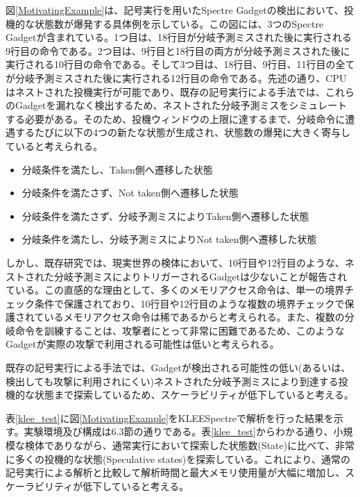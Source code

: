 図\ref{MotivatingExample}は、記号実行を用いたSpectre Gadgetの検出において、投機的な状態数が爆発する具体例を示している。この図には、3つのSpectre Gadgetが含まれている。1つ目は、18行目が分岐予測ミスされた後に実行される9行目の命令である。2つ目は、9行目と18行目の両方が分岐予測ミスされた後に実行される10行目の命令である。そして3つ目は、18行目、9行目、11行目の全てが分岐予測ミスされた後に実行される12行目の命令である。先述の通り、CPUはネストされた投機実行が可能であり、既存の記号実行による手法\cite{guarnieri2020spectector,wang2020kleespectre}では、これらのGadgetを漏れなく検出するため、ネストされた分岐予測ミスをシミュレートする必要がある。そのため、投機ウィンドウの上限に達するまで、分岐命令に遭遇するたびに以下の4つの新たな状態が生成され、状態数の爆発に大きく寄与していると考えられる。\par

\begin{itemize}
  \item 分岐条件を満たし、Taken側へ遷移した状態
  \item 分岐条件を満たさず、Not taken側へ遷移した状態
  \item 分岐条件を満たさず、分岐予測ミスによりTaken側へ遷移した状態  
  \item 分岐条件を満たし、分岐予測ミスによりNot taken側へ遷移した状態
\end{itemize}

しかし、既存研究\cite{oleksenko2020specfuzz}では、現実世界の検体において、10行目や12行目のような、ネストされた分岐予測ミスによりトリガーされるGadgetは少ないことが報告されている。この直感的な理由として、多くのメモリアクセス命令は、単一の境界チェック条件で保護されており、10行目や12行目のような複数の境界チェックで保護されているメモリアクセス命令は稀であるからと考えられる。また、複数の分岐命令を訓練することは、攻撃者にとって非常に困難であるため、このようなGadgetが実際の攻撃で利用される可能性は低いと考えられる。\par
既存の記号実行による手法では、Gadgetが検出される可能性の低い(あるいは、検出しても攻撃に利用されにくい)ネストされた分岐予測ミスにより到達する投機的な状態まで探索しているため、スケーラビリティが低下していると考える。\par

表\ref{klee_test}に図\ref{MotivatingExample}をKLEESpectreで解析を行った結果を示す。実験環境及び構成は6.3節の通りである。表\ref{klee_test}からわかる通り、小規模な検体でありながら、通常実行において探索した状態数(State)に比べて、非常に多くの投機的な状態(Speculative states)を探索している。これにより、通常の記号実行による解析と比較して解析時間と最大メモリ使用量が大幅に増加し、スケーラビリティが低下していると考える。\par

